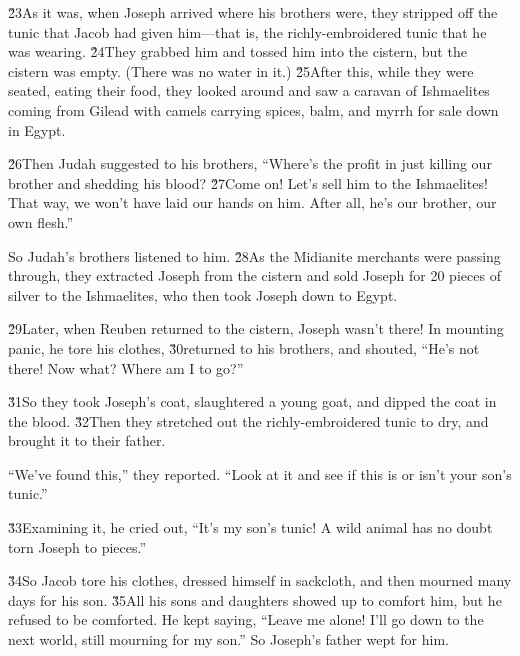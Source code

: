 \v{23}As it was, when Joseph arrived where his brothers were, they stripped off the tunic that Jacob had given him---that is, the richly-embroidered tunic that he was wearing. \v{24}They grabbed him and tossed him into the cistern, but the cistern was empty. (There was no water in it.) \v{25}After this, while they were seated, eating their food, they looked around and saw a caravan of Ishmaelites coming from Gilead with camels carrying spices, balm, and myrrh for sale down in Egypt.

\v{26}Then Judah suggested to his brothers, ``Where's the profit in just killing our brother and shedding his blood? \v{27}Come on! Let's sell him to the Ishmaelites! That way, we won't have laid our hands on him. After all, he's our brother, our own flesh.''

So Judah's brothers listened to him. \v{28}As the Midianite merchants were passing through, they extracted Joseph from the cistern and sold Joseph for 20 pieces of silver to the Ishmaelites, who then took Joseph down to Egypt.

\v{29}Later, when Reuben returned to the cistern, Joseph wasn't there! In mounting panic, he tore his clothes, \v{30}returned to his brothers, and shouted, ``He's not there! Now what? Where am I to go?''

\v{31}So they took Joseph's coat, slaughtered a young goat, and dipped the coat in the blood. \v{32}Then they stretched out the richly-embroidered tunic to dry, and brought it to their father.

``We've found this,'' they reported. ``Look at it and see if this is or isn't your son's tunic.''

\v{33}Examining it, he cried out, ``It's my son's tunic! A wild animal has no doubt torn Joseph to pieces.''

\v{34}So Jacob tore his clothes, dressed himself in sackcloth, and then mourned many days for his son. \v{35}All his sons and daughters showed up to comfort him, but he refused to be comforted. He kept saying, ``Leave me alone! I'll go down to the next world, still mourning for my son.'' So Joseph's father wept for him.

